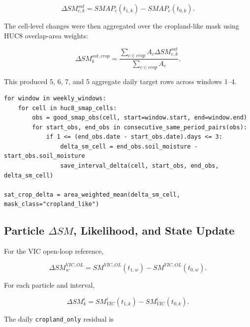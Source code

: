 \documentclass[11pt]{article}
\newcommand{\code}[1]{\texttt{#1}}
\begin{document}
\begin{equation}
\Delta SM^{sat}_{c,k} = SMAP_{c}(t_{1,k}) - SMAP_{c}(t_{0,k}).
\label{eq:sat_delta_cell}
\end{equation}

The cell-level changes were then aggregated over the cropland-like mask using HUC8 overlap-area weights:

\begin{equation}
\Delta SM^{sat,crop}_{k} =
\frac{\sum_{c \in crop} A_c \Delta SM^{sat}_{c,k}}{\sum_{c \in crop} A_c}.
\label{eq:sat_delta_crop}
\end{equation}

This produced 5, 6, 7, and 5 aggregate daily target rows across windows 1--4.

\begin{lstlisting}[style=pythonstyle,caption={Simplified daily within-window $\Delta SM$ target construction.},label={lst:delta_target}]
for window in weekly_windows:
    for cell in huc8_smap_cells:
        obs = good_smap_obs(cell, start=window.start, end=window.end)
        for start_obs, end_obs in consecutive_same_period_pairs(obs):
            if 1 <= (end_obs.date - start_obs.date).days <= 3:
                delta_sm_cell = end_obs.soil_moisture - start_obs.soil_moisture
                save_interval_delta(cell, start_obs, end_obs, delta_sm_cell)

sat_crop_delta = area_weighted_mean(delta_sm_cell, mask_class="cropland_like")
\end{lstlisting}

\subsection{Particle \texorpdfstring{$\Delta SM$}{Delta SM}, Likelihood, and State Update}

For the VIC open-loop reference,

\begin{equation}
\Delta SM^{VIC,OL}_w = SM^{VIC,OL}(t_{1,w}) - SM^{VIC,OL}(t_{0,w}).
\label{eq:vic_open_loop_delta}
\end{equation}

For each particle and interval,

\begin{equation}
\Delta SM^{i}_{k} = SM^{i}_{VIC}(t_{1,k}) - SM^{i}_{VIC}(t_{0,k}).
\label{eq:particle_delta}
\end{equation}

The daily \code{cropland\_only} residual is
\end{document}
